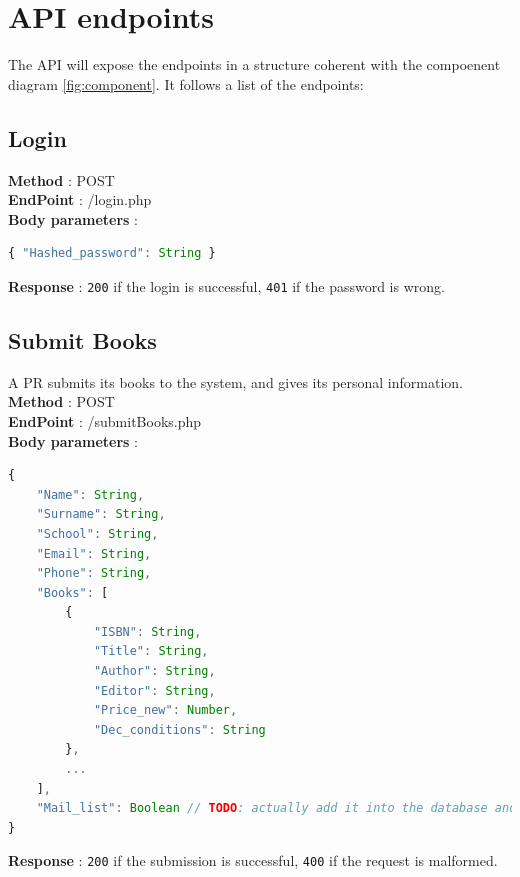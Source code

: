 \section{API endpoints}

The API will expose the endpoints in a structure coherent with the compoenent diagram \ref{fig:component}. It follows a list of the endpoints:

\subsection{Login}
\textbf{Method} : POST \\
\textbf{EndPoint} : /login.php \\
\textbf{Body parameters} :
\begin{lstlisting}[language=JavaScript, label={lst:jscode}, basicstyle=\ttfamily]
{ "Hashed_password": String }
\end{lstlisting}
\textbf{Response} : \texttt{200} if the login is successful, \texttt{401} if the password is wrong.

\subsection{Submit Books}
A PR submits its books to the system, and gives its personal information.\\
\textbf{Method} : POST \\
\textbf{EndPoint} : /submitBooks.php \\
\textbf{Body parameters} :
\begin{lstlisting}[language=JavaScript, label={lst:jscode}, basicstyle=\ttfamily]
{
    "Name": String,
    "Surname": String,
    "School": String,
    "Email": String,
    "Phone": String,
    "Books": [
        {
            "ISBN": String,
            "Title": String,
            "Author": String,
            "Editor": String,
            "Price_new": Number,
            "Dec_conditions": String
        },
        ...
    ],
    "Mail_list": Boolean // TODO: actually add it into the database and the form
}
\end{lstlisting}
\textbf{Response} : \texttt{200} if the submission is successful, \texttt{400} if the request is malformed.

